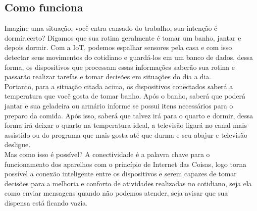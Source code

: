 \documentclass{classe_cn}                 %
\begin{document}
\subsection{Como funciona}
Imagine uma situação, você entra cansado do trabalho, sua intenção 
é dormir,certo? Digamos que sua rotina geralmente é tomar um banho, 
jantar e depois dormir. Com a IoT, podemos espalhar sensores pela 
casa e com isso detectar seus movimentos do cotidiano e guardá-los 
em um banco de dados, dessa forma, os dispositivos que processam 
essas informações saberão sua rotina e passarão realizar tarefas 
e tomar decisões em situações do dia a dia.\\

Portanto, para a situação citada acima, os dispositivos conectados 
saberá a temperatura que você gosta de tomar banho. Após o banho, 
saberá que poderá jantar e sua geladeira ou armário informe se 
possui itens necessários para o preparo da comida. Após isso, 
saberá que talvez irá para o quarto e dormir, dessa forma irá 
deixar o quarto na temperatura ideal, a televisão ligará no canal 
mais assistido ou do programa que mais gosta até que durma e seu 
abajur e televisão desligue.\\

Mas como isso é possível? A conectividade é a palavra chave para o 
funcionamento dos aparelhos com o princípio de Internet das Coisas, 
logo torna possível a conexão inteligente entre os dispositivos e 
serem capazes de tomar decisões para a melhoria e conforto de 
atividades realizadas no cotidiano, seja ela como enviar mensagens 
quando não podemos atender, seja avisar que sua dispensa está ficando vazia.

\end{document}
